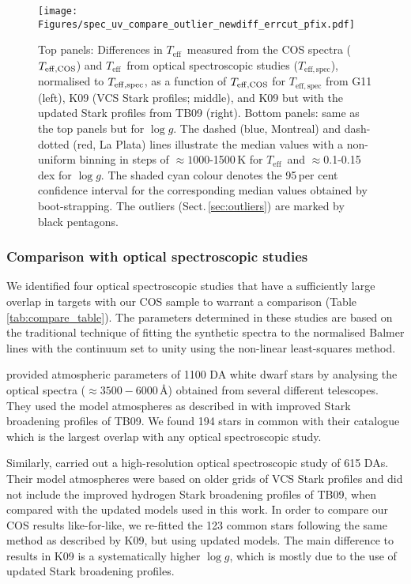 \documentclass[fleqn,usenatbib, useAMS]{mnras}
\newcommand{\Teff}{\mbox{$T_{\mathrm{eff}}$}}
\newcommand{\logg}{\mbox{$\log g$}}
\begin{document}
\begin{figure*}
\centering
\texttt{[image: Figures/spec\_uv\_compare\_outlier\_newdiff\_errcut\_pfix.pdf]}
\caption{Top panels: Differences in \Teff\ measured from the COS spectra ($T_{\rm{eff,COS}}$) and  \Teff\ from optical spectroscopic studies ($T_\mathrm{eff,spec}$), normalised to  $T_{\rm{eff,spec}}$, as a function of  $T_{\rm{eff,COS}}$ for $T_\mathrm{eff,spec}$ from  G11 (left), K09 (VCS Stark profiles; middle), and K09 but with the updated Stark profiles from TB09 (right). Bottom panels: same as the top panels but for \logg.  The dashed (blue, Montreal) and dash-dotted (red, La Plata) lines illustrate the median values with a non-uniform binning in steps of $\approx1000$-1500\,K for \Teff\ and $\approx$0.1-0.15\,dex for \logg. The shaded cyan colour denotes the 95\,per cent confidence interval for the corresponding median values obtained by boot-strapping. The outliers (Sect.\,\ref{sec:outliers}) are marked by black pentagons.}
\label{fig:spec_uv_comp}
\end{figure*}

\subsubsection{Comparison with optical spectroscopic studies}
We identified four optical spectroscopic studies that have a sufficiently large overlap in targets with our COS sample to warrant a comparison (Table\,\ref{tab:compare_table}). The parameters determined in these studies are based on the traditional technique of fitting the synthetic spectra to the normalised Balmer lines with the continuum set to unity using the non-linear least-squares method. 

\citet[G11; hereafter]{Gianninas2011} provided atmospheric parameters of 1100 DA white dwarf stars by analysing the optical spectra ($\approx3500-6000$\,\AA) obtained from several different telescopes. They used the model atmospheres as described in \cite{Liebert2005, Tremblay2011} with improved Stark broadening profiles of TB09. We found 194 stars in common with their catalogue which is the largest overlap with any optical spectroscopic study. 

Similarly, \citet[K09; hereafter]{Koester2009} carried out a high-resolution optical spectroscopic study of 615 DAs. Their model atmospheres were based on older grids of VCS Stark profiles \citep{vidal1973} and did not include the improved hydrogen Stark broadening profiles of TB09, when compared with the updated models used in this work. In order to compare our COS results like-for-like, we re-fitted the 123 common stars following the same method as described by K09, but using updated models. The main difference to results in K09 is a systematically higher \logg, which is mostly due to the use of updated Stark broadening profiles. 
\end{document}
